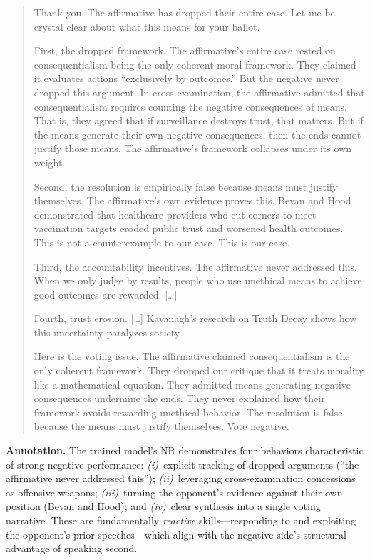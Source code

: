 \begin{quote}
\small
Thank you. The affirmative has dropped their entire case. Let me be crystal
clear about what this means for your ballot.

First, the dropped framework. The affirmative's entire case rested on
consequentialism being the only coherent moral framework. They claimed it
evaluates actions ``exclusively by outcomes.'' But the negative never dropped
this argument. In cross examination, the affirmative admitted that
consequentialism requires counting the negative consequences of means. That
is, they agreed that if surveillance destroys trust, that matters. But if the
means generate their own negative consequences, then the ends cannot justify
those means. The affirmative's framework collapses under its own weight.

Second, the resolution is empirically false because means must justify
themselves. The affirmative's own evidence proves this. Bevan and Hood
demonstrated that healthcare providers who cut corners to meet vaccination
targets eroded public trust and worsened health outcomes. This is not a
counterexample to our case. This is our case.

Third, the accountability incentives. The affirmative never addressed this.
When we only judge by results, people who use unethical means to achieve good
outcomes are rewarded. [\ldots]

Fourth, trust erosion. [\ldots] Kavanagh's research on Truth Decay shows how
this uncertainty paralyzes society.

Here is the voting issue. The affirmative claimed consequentialism is the
only coherent framework. They dropped our critique that it treats morality
like a mathematical equation. They admitted means generating negative
consequences undermine the ends. They never explained how their framework
avoids rewarding unethical behavior. The resolution is false because the
means must justify themselves. Vote negative.
\end{quote}

\noindent\textbf{Annotation.} The trained model's NR demonstrates four
behaviors characteristic of strong negative performance:
\textit{(i)}~explicit tracking of dropped arguments (``the affirmative
never addressed this'');
\textit{(ii)}~leveraging cross-examination concessions as offensive weapons;
\textit{(iii)}~turning the opponent's evidence against their own position
(Bevan and Hood); and
\textit{(iv)}~clear synthesis into a single voting narrative.
These are fundamentally \emph{reactive} skills---responding to and
exploiting the opponent's prior speeches---which align with the negative
side's structural advantage of speaking second.

